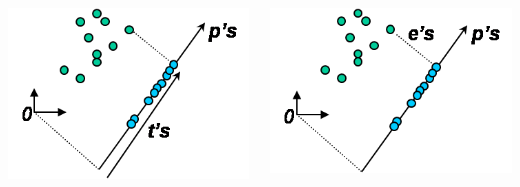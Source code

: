 \documentclass[10pt, colorlinks]{beamer}
\begin{document}
\begin{frame}
\begin{columns}
\begin{column}{0.3\textwidth}
\begin{center}
                \centering \includegraphics[width=\columnwidth]{figs/pcab2}
            \end{center}            
        \end{column}
        \pause         \begin{column}{0.3\textwidth}
            \begin{center}
                \centering \includegraphics[width=\columnwidth]{figs/pcab3}
            \end{center}            
        \end{column}     
    \end{columns}
\end{frame}
\end{document}

